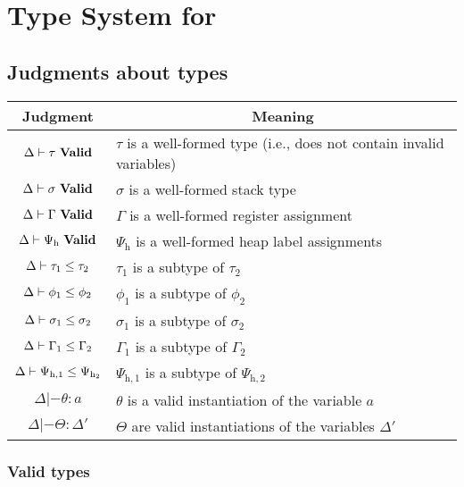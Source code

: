 \chapter{Type System for \ATAL}
\label{chap:types}

\section{Judgments about types}

\begin{tabular}{|c|p{7.5 cm}|}
  \hline
  Judgment & \multicolumn{1}{|c|}{Meaning} \\
  \hline

  $\valid{\Delta}{\tau}$ & $\tau$ is a well-formed type (i.e., does not contain invalid variables) \\
  ${\Delta} |- {\sigma}\ \mathbf{Valid}$ & $\sigma$ is a well-formed stack type \\
  ${\Delta} |- {\Gamma}\ \mathbf{Valid}$ & $\Gamma$ is a well-formed register assignment \\
  ${\Delta} |- {\Psi_{\mathrm{h}}}\ \mathbf{Valid}$ & $\Psi_{\mathrm{h}}$ is a well-formed heap label assignments \\
  \hline

  ${\Delta} |- {\tau_1} \le {\tau_2}$ & $\tau_1$ is a subtype of $\tau_2$ \\
  ${\Delta} |- {\phi_1} \le {\phi_2}$ & $\phi_1$ is a subtype of $\phi_2$ \\
  ${\Delta} |- {\sigma_1} \le {\sigma_2}$ & $\sigma_1$ is a subtype of $\sigma_2$ \\
  ${\Delta} |- {\Gamma_1} \le {\Gamma_2}$ & $\Gamma_1$ is a subtype of $\Gamma_2$ \\
  ${\Delta} |- {\Psi_{\mathrm{h},1}} \le {\Psi_{\mathrm{h}_2}}$ & $\Psi_{\mathrm{h},1}$ is a subtype of $\Psi_{\mathrm{h},2}$ \\
  \hline

  $\Delta |- \theta : a$ & $\theta$ is a valid instantiation of the variable $a$ \\
  $\Delta |- \Theta : \Delta'$ & $\Theta$ are valid instantiations of the variables $\Delta'$ \\
  \hline
\end{tabular}


\subsection{Valid types}
\fbox{$\valid{\Delta}{\tau}$}

